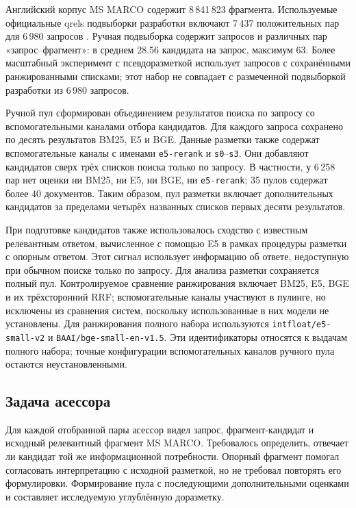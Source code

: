 \documentclass[runningheads,a4paper]{llncs}
\begin{document}
Английский корпус MS MARCO содержит 8\,841\,823 фрагмента. Используемые официальные qrels подвыборки разработки включают 7\,437 положительных пар для 6\,980 запросов \cite{msmarco_datasets}. Ручная подвыборка содержит \ManualQueryCount{} запросов и \ManualPairCount{} различных пар «запрос--фрагмент»: в среднем 28.56 кандидата на запрос, максимум 63. Более масштабный эксперимент с псевдоразметкой использует \FullQueryCount{} запросов с сохранёнными ранжированными списками; этот набор не совпадает с размеченной подвыборкой разработки из 6\,980 запросов.

Ручной пул сформирован объединением результатов поиска по запросу со вспомогательными каналами отбора кандидатов. Для каждого запроса сохранено по десять результатов BM25, E5 и BGE. Данные разметки также содержат вспомогательные каналы с именами \texttt{e5-rerank} и \texttt{s0}--\texttt{s3}. Они добавляют кандидатов сверх трёх списков поиска только по запросу. В частности, у 6\,258 пар нет оценки ни BM25, ни E5, ни BGE, ни \texttt{e5-rerank}; 35 пулов содержат более 40 документов. Таким образом, пул разметки включает дополнительных кандидатов за пределами четырёх названных списков первых десяти результатов.

При подготовке кандидатов также использовалось сходство с известным релевантным ответом, вычисленное с помощью E5 в рамках процедуры разметки с опорным ответом. Этот сигнал использует информацию об ответе, недоступную при обычном поиске только по запросу. Для анализа разметки сохраняется полный пул. Контролируемое сравнение ранжирования включает BM25, E5, BGE и их трёхсторонний RRF; вспомогательные каналы участвуют в пулинге, но исключены из сравнения систем, поскольку использованные в них модели не установлены. Для ранжирования полного набора используются \texttt{intfloat/e5-small-v2} и \texttt{BAAI/bge-small-en-v1.5}. Эти идентификаторы относятся к выдачам полного набора; точные конфигурации вспомогательных каналов ручного пула остаются неустановленными.

\subsection{Задача асессора}
\label{sec:annotation}

Для каждой отобранной пары асессор видел запрос, фрагмент-кандидат и исходный релевантный фрагмент MS MARCO. Требовалось определить, отвечает ли кандидат той же информационной потребности. Опорный фрагмент помогал согласовать интерпретацию с исходной разметкой, но не требовал повторять его формулировки. Формирование пула с последующими дополнительными оценками и составляет исследуемую углублённую доразметку.
\end{document}
